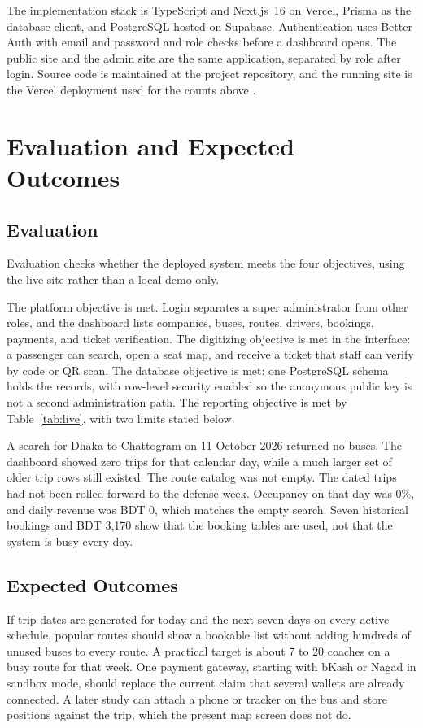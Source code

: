 \documentclass[12pt,a4paper]{report}
\begin{document}
The implementation stack is TypeScript and Next.js~16 on Vercel, Prisma as the database client, and PostgreSQL hosted on Supabase. Authentication uses Better Auth with email and password and role checks before a dashboard opens. The public site and the admin site are the same application, separated by role after login. Source code is maintained at the project repository, and the running site is the Vercel deployment used for the counts above \cite{nextjs2026,prisma2026}.

\section{Evaluation and Expected Outcomes}
\subsection{Evaluation}
Evaluation checks whether the deployed system meets the four objectives, using the live site rather than a local demo only.

The platform objective is met. Login separates a super administrator from other roles, and the dashboard lists companies, buses, routes, drivers, bookings, payments, and ticket verification. The digitizing objective is met in the interface: a passenger can search, open a seat map, and receive a ticket that staff can verify by code or QR scan. The database objective is met: one PostgreSQL schema holds the records, with row-level security enabled so the anonymous public key is not a second administration path. The reporting objective is met by Table~\ref{tab:live}, with two limits stated below.

A search for Dhaka to Chattogram on 11 October 2026 returned no buses. The dashboard showed zero trips for that calendar day, while a much larger set of older trip rows still existed. The route catalog was not empty. The dated trips had not been rolled forward to the defense week. Occupancy on that day was 0\%, and daily revenue was BDT 0, which matches the empty search. Seven historical bookings and BDT 3,170 show that the booking tables are used, not that the system is busy every day.

\subsection{Expected Outcomes}
If trip dates are generated for today and the next seven days on every active schedule, popular routes should show a bookable list without adding hundreds of unused buses to every route. A practical target is about 7 to 20 coaches on a busy route for that week. One payment gateway, starting with bKash or Nagad in sandbox mode, should replace the current claim that several wallets are already connected. A later study can attach a phone or tracker on the bus and store positions against the trip, which the present map screen does not do.
\end{document}
